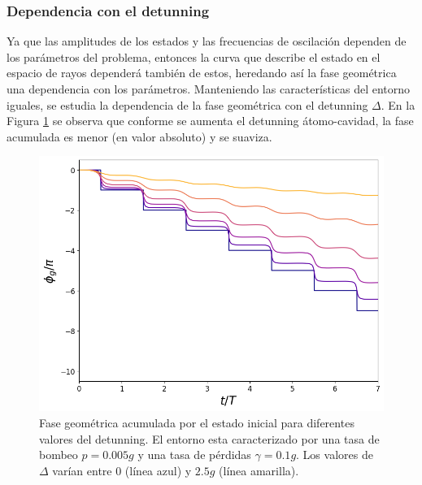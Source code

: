 \subsubsection{Dependencia con el detunning}
Ya que las amplitudes de los estados y las frecuencias de oscilación dependen de los parámetros del problema, entonces la curva que describe el estado en el espacio de rayos dependerá también de estos, heredando así la fase geométrica una dependencia con los parámetros. Manteniendo las características del entorno iguales, se estudia la dependencia de la fase geométrica con el detunning $\Delta$. En la Figura \ref{fig3:fg detunning} se observa que conforme se aumenta el detunning átomo-cavidad, la fase acumulada es menor (en valor absoluto) y se suaviza.
\begin{figure}[h]
    \begin{minipage}[c]{0.67\textwidth}
        \includegraphics[width=\textwidth]{figuras/ch3/fg detunning.png}
    \end{minipage}\hfill
    \begin{minipage}[c]{0.3\textwidth}
    \caption{Fase geométrica acumulada por el estado inicial para diferentes valores del detunning. El entorno esta caracterizado por una tasa de bombeo $p=0.005g$ y una tasa de pérdidas $\gamma=0.1g$. Los valores de $\Delta$ varían entre $0$ (línea azul) y $2.5g$ (línea amarilla).}
    \label{fig3:fg detunning}
  \end{minipage}
\end{figure}

